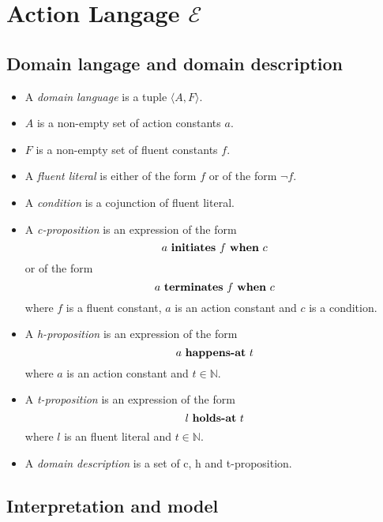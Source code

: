 \section{Action Langage $\mathcal{E}$}\label{sec:e}

\theoremstyle{definition}
\newtheorem{definition}{Definition}[section]

\subsection{Domain langage and domain description}

\begin{itemize}
  \item A \emph{domain language} is a tuple $\langle A,F\rangle$.
  \item $A$ is a non-empty set of action constants $a$.
  \item $F$ is a non-empty set of fluent constants $f$.
  \item A \emph{fluent literal} is either of the form $f$ or of the form $\neg f$.
  \item A \emph{condition} is a cojunction of fluent literal.
  \item A \emph{c-proposition} is an expression of the form
    $$a \text{ \textbf{initiates} } f \text{ \textbf{when} } c$$
    or of the form
    $$a \text{ \textbf{terminates} } f \text{ \textbf{when} } c$$
    where $f$ is a fluent constant, $a$ is an action constant and $c$ is a condition.
  \item A \emph{h-proposition} is an expression of the form
    $$a \text{ \textbf{happens-at} } t$$
    where $a$ is an action constant and $t \in \mathbb{N}$.
  \item A \emph{t-proposition} is an expression of the form
    $$l \text{ \textbf{holds-at} } t$$
    where $l$ is an fluent literal and $t \in \mathbb{N}$.
  \item A \emph{domain description} is a set of c, h and t-proposition.
\end{itemize}

\subsection{Interpretation and model}

